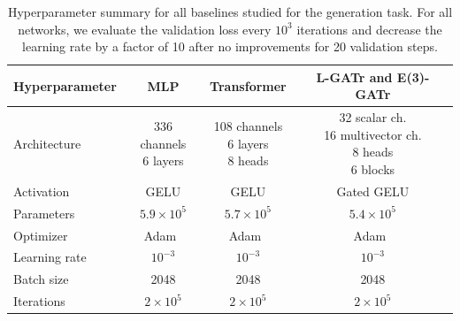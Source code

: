 \documentclass[submission, Phys]{SciPost}
\begin{document}
\begin{table}[b!]
    \centering
    \begin{tabular}{l ccc}
        \toprule
        Hyperparameter & MLP & Transformer & L-GATr and E(3)-GATr \\[1mm]
        \midrule
        Architecture & \makecell{336 channels\\ 6 layers} & \makecell{108 channels \\ 6 layers \\ 8 heads} & \makecell{32 scalar ch.\\16 multivector ch.\\8 heads\\6 blocks} \\
        Activation & GELU & GELU & Gated GELU \\
        Parameters & $5.9\times 10^5$ & $5.7\times 10^5$ & $5.4\times 10^5$ \\
        \midrule        
        Optimizer & Adam~\cite{adam} & Adam~\cite{adam} & Adam~\cite{adam} \\
        Learning rate & $10^{-3}$ & $10^{-3}$ & $10^{-3}$ \\
        Batch size & 2048 & 2048 & 2048 \\
        Iterations & $2 \times 10^5$ & $2 \times 10^5$& $2 \times 10^5$
        \\
        \bottomrule
    \end{tabular} 
    \caption{Hyperparameter summary for all baselines studied for the generation task. For all networks, we evaluate the validation loss every $10^3$ iterations and decrease the learning rate by a factor of 10 after no improvements for 20 validation steps.} 
    \label{tab:gen_build}
\end{table}
\end{document}
